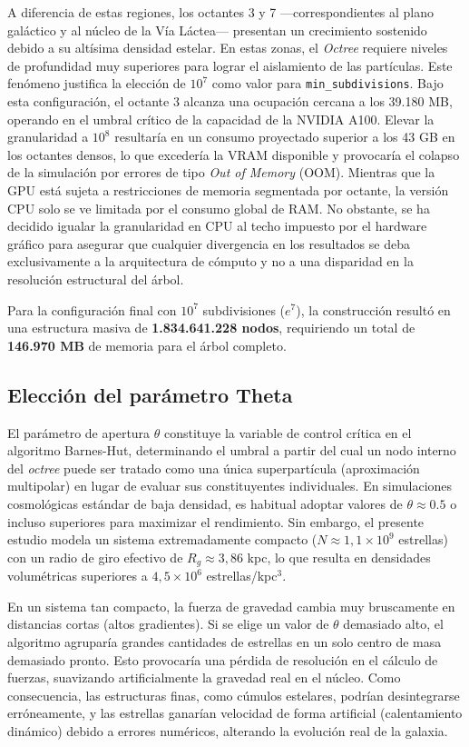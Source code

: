 A diferencia de estas regiones, los octantes 3 y 7 —correspondientes al plano galáctico y al núcleo de la Vía Láctea— presentan un crecimiento sostenido debido a su altísima densidad estelar.
En estas zonas, el \textit{Octree} requiere niveles de profundidad muy superiores para lograr el aislamiento de las partículas.
Este fenómeno justifica la elección de \textbf{$10^7$} como valor para \texttt{min\_subdivisions}.
Bajo esta configuración, el octante 3 alcanza una ocupación cercana a los 39.180 MB, operando en el umbral crítico de la capacidad de la NVIDIA A100.
Elevar la granularidad a $10^8$ resultaría en un consumo proyectado superior a los 43 GB en los octantes densos, lo que excedería la VRAM disponible y provocaría el colapso de la simulación por errores de tipo \textit{Out of Memory} (OOM).
Mientras que la GPU está sujeta a restricciones de memoria segmentada por octante, la versión CPU solo se ve limitada por el consumo global de RAM.
No obstante, se ha decidido igualar la granularidad en CPU al techo impuesto por el hardware gráfico para asegurar que cualquier divergencia en los resultados se deba exclusivamente a la arquitectura de cómputo y no a una disparidad en la resolución estructural del árbol.

Para la configuración final con $10^7$ subdivisiones ($e^7$), la construcción resultó en una estructura masiva de \textbf{1.834.641.228 nodos}, requiriendo un total de \textbf{146.970 MB} de memoria para el árbol completo.

\subsection{Elección del parámetro Theta}\label{subsec:eleccion-parametro-theta-theta}

El parámetro de apertura $\theta$ constituye la variable de control crítica en el algoritmo Barnes-Hut, determinando el umbral a partir del cual un nodo interno del \textit{octree} puede ser tratado como una única superpartícula (aproximación multipolar) en lugar de evaluar sus constituyentes individuales.
En simulaciones cosmológicas estándar de baja densidad, es habitual adoptar valores de $\theta \approx 0.5$ o incluso superiores para maximizar el rendimiento.
Sin embargo, el presente estudio modela un sistema extremadamente compacto ($N \approx 1,1 \times 10^9$ estrellas) con un radio de giro efectivo de $R_g \approx 3,86$ kpc, lo que resulta en densidades volumétricas superiores a $4,5 \times 10^6$ estrellas/kpc$^3$.

En un sistema tan compacto, la fuerza de gravedad cambia muy bruscamente en distancias cortas (altos gradientes).
Si se elige un valor de $\theta$ demasiado alto, el algoritmo agruparía grandes cantidades de estrellas en un solo centro de masa demasiado pronto.
Esto provocaría una pérdida de resolución en el cálculo de fuerzas, suavizando artificialmente la gravedad real en el núcleo.
Como consecuencia, las estructuras finas, como cúmulos estelares, podrían desintegrarse erróneamente, y las estrellas ganarían velocidad de forma artificial (calentamiento dinámico) debido a errores numéricos, alterando la evolución real de la galaxia.

